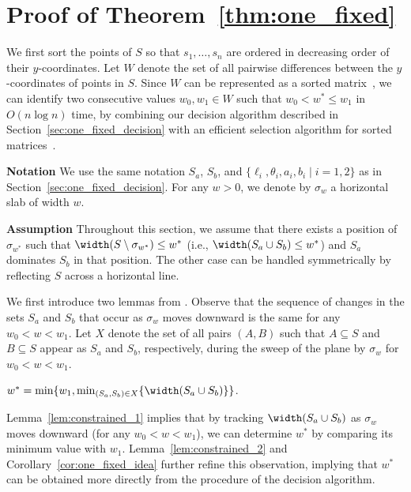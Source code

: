 \section{Proof of Theorem~\ref{thm:one_fixed}}
\label{sec:one_fixed_appendix}



We first sort the points of $S$ so that $s_1, \ldots, s_n$ are ordered in decreasing order of their $y$-coordinates.
Let $W$ denote the set of all pairwise differences between the $y$-coordinates of points in $S$.
Since $W$ can be represented as a sorted matrix~\cite{frederickson1982complexity}, we can identify two consecutive values $w_0, w_1 \in W$ such that $w_0 < w^* \le w_1$ in $O(n \log n)$ time, by combining our decision algorithm described in Section~\ref{sec:one_fixed_decision} with an efficient selection algorithm for sorted matrices~\cite{frederickson1984generalized}.

\textbf{Notation} We use the same notation $S_a$, $S_b$, and $\{\ell_i, \theta_i, a_i, b_i \mid i = 1, 2\}$ as in Section~\ref{sec:one_fixed_decision}.
For any $w > 0$, we denote by $\sigma_w$ a horizontal slab of width $w$.

\textbf{Assumption}
Throughout this section, we assume that there exists a position of $\sigma_{w^*}$ such that $\width(S \setminus \sigma_{w^*}) \le w^*$  (i.e., $\width(S_a\cup S_b) \le w^*$) and $S_a$ dominates $S_b$ in that position.
The other case can be handled symmetrically by reflecting $S$ across a horizontal line.

We first introduce two lemmas from \cite{ahn2024constrained}.
Observe that the sequence of changes in the sets $S_a$ and $S_b$ that occur as $\sigma_w$ moves downward is the same for any $w_0 < w < w_1$.
Let $X$ denote the set of all pairs $(A, B)$ such that $A \subseteq S$ and $B \subseteq S$ appear as $S_a$ and $S_b$, respectively, during the sweep of the plane by $\sigma_w$ for $w_0 < w < w_1$.


\begin{lemma}
    \label{lem:constrained_1}
    $w^* = \min \{w_1,  \min_{(S_a, S_b) \in X} \{\width(S_a\cup S_b) \}\}$.
\end{lemma}

Lemma~\ref{lem:constrained_1} implies that by tracking $\width(S_a \cup S_b)$ as $\sigma_w$ moves downward (for any $w_0 < w < w_1$), we can determine $w^*$ by comparing its minimum value with $w_1$.
Lemma~\ref{lem:constrained_2} and Corollary~\ref{cor:one_fixed_idea} further refine this observation, implying that $w^*$ can be obtained more directly from the procedure of the decision algorithm.

